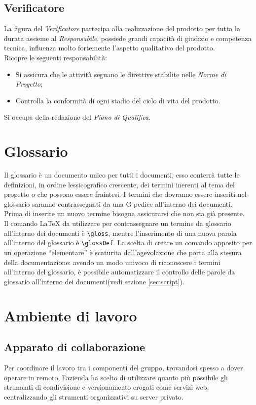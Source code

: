 \documentclass{scalatekids-article}
\begin{document}
\subsection{Verificatore}
La figura del \textit{Verificatore} partecipa alla realizzazione del prodotto per
tutta la durata assieme al \textit{Responsabile}, possiede grandi capacità di
giudizio e competenza tecnica, influenza molto fortemente l'aspetto qualitativo
del prodotto.\\ Ricopre le seguenti responsabilità:
\begin{itemize}
  \item Si assicura che le attività seguano le direttive stabilite nelle \textit{Norme di Progetto};
  \item Controlla la conformità di ogni stadio del ciclo di vita del prodotto.
\end{itemize}
Si occupa della redazione del \textit{Piano di Qualifica}.
\section{Glossario}
Il glossario è un documento unico per tutti i documenti, esso conterrà tutte le
definizioni, in ordine lessicografico crescente, dei termini inerenti al tema
del progetto o che possono essere fraintesi. I termini che dovranno essere
inseriti nel glossario saranno contrassegnati da una G pedice all'interno dei
documenti. Prima di inserire un nuovo termine bisogna assicurarsi che non sia
già presente.\\ Il comando \LaTeX\xspace da utilizzare per contrassegnare un
termine da glossario all'interno dei documenti è \verb=\gloss=, mentre l'inserimento
di una nuova parola all'interno del glossario è \verb=\glossDef=. La scelta di creare
un comando apposito per un operazione ``elementare'' è scaturita
dall'agevolazione che porta alla stesura della documentazione: avendo un modo
univoco di riconoscere i termini all'interno del glossario, è possibile
automatizzare il controllo delle parole da glossario all'interno dei
documenti(vedi sezione \ref{sec:script}).

\section{Ambiente di lavoro}
\subsection{Apparato di collaborazione}
Per coordinare il lavoro tra i componenti del gruppo, trovandosi spesso a dover
operare in remoto, l'azienda ha scelto di utilizzare quanto più possibile gli
strumenti di condivisione e versionamento erogati come servizi web,
centralizzando gli strumenti organizzativi su server privato.
\end{document}
